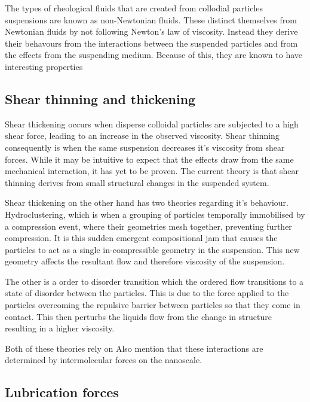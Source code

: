  The types of rheological fluids that are created from collodial particles suspensions are known as non-Newtonian fluids. These distinct themselves from Newtonian fluids by not following Newton's law of viscosity. Instead they derive their behavours from the interactions between the suspended particles and from the effects from the suspending medium. Because of this, they are known to have interesting properties \cite{Rheo2}
 
 \subsection{Shear thinning and thickening}
 
 Shear thickening occurs when disperse colloidal particles are subjected to a high shear force, leading to an increase in the observed viscosity. Shear thinning consequently is when the same suspension decreases it's viscosity from shear forces. While it may be intuitive to expect that the effects draw from the same mechanical interaction, it has yet to be proven. The current theory is that shear thinning derives from small structural changes in the suspended system. 
 
 
 Shear thickening on the other hand has two theories regarding it's behaviour. Hydroclustering, which is when a grouping of particles temporally immobilised by a compression event, where their geometries mesh together, preventing further compression. It is this sudden emergent compositional jam that causes the particles to act as a single in-compressible geometry in the suspension. This new geometry affects the resultant flow and therefore viscosity of the suspension. \cite{hydroshock}
 
 The other is a order to disorder transition which the ordered flow transitions to a state of disorder between the particles. This is due to the force applied to the particles overcoming the repulsive barrier between particles so that they come in contact. This then perturbs the liquids flow from the change in structure resulting in a higher viscosity. \cite{ShockCrash}
 
Both of these theories rely on Also mention that these interactions are determined by intermolecular forces on the nanoscale.
 


\cite{SmartMats, Rheo2}

\subsection{Lubrication forces}

